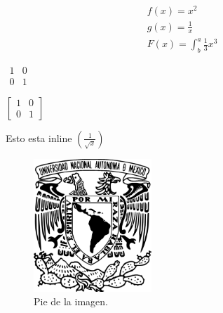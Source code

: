 \documentclass[a4paper,11pt]{article}                 %
\begin{document}
  \begin{align*}                                     %
    f(x) = x^2\\
    g(x) = \frac{1}{x}\\
    F(x) = \int^a_b \frac{1}{3}x^3
  \end{align*}

  \begin{center}
    $
      \begin{matrix}
        1 & 0\\
        0 & 1
      \end{matrix}
    $
  \end{center}
  \begin{center}
    $
      \left[
        \begin{matrix}
          1 & 0\\
          0 & 1
        \end{matrix}
      \right]
    $  
  \end{center}
  
  Esto esta inline $\left(\frac{1}{\sqrt{x}}\right)$  %
  
  \begin{figure}[H]
    \centering                                        %
    \includegraphics[height=5cm]{images/escudo-unam}  %
    \caption{Pie de la imagen.}                       %
    \label{fig:fig1}                                  %
  \end{figure}
\end{document}

